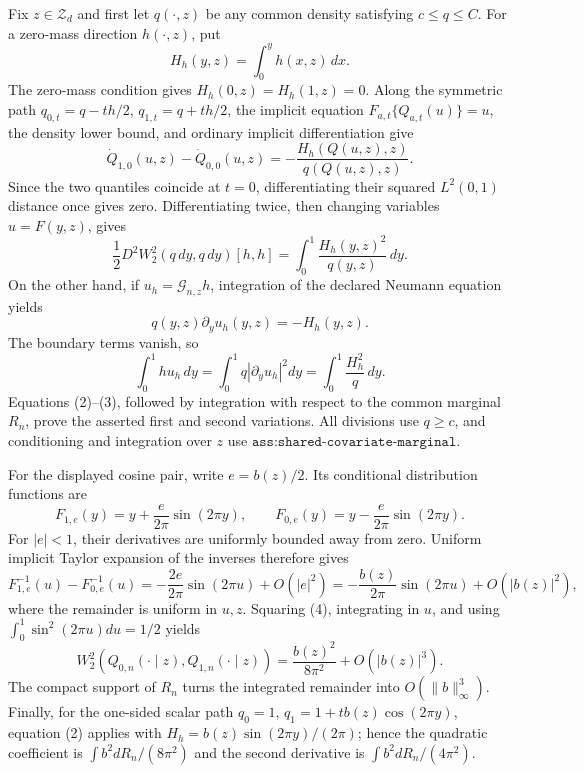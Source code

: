 Fix \(z\in\mathcal Z_d\) and first let \(q(\cdot,z)\) be any common density satisfying \(c\le q\le C\). For a zero-mass direction \(h(\cdot,z)\), put
\[
H_h(y,z)=\int_0^yh(x,z)\,dx.
\]
The zero-mass condition gives \(H_h(0,z)=H_h(1,z)=0\). Along the symmetric path \(q_{0,t}=q-th/2\), \(q_{1,t}=q+th/2\), the implicit equation \(F_{a,t}\{Q_{a,t}(u)\}=u\), the density lower bound, and ordinary implicit differentiation give
\[
\dot Q_{1,0}(u,z)-\dot Q_{0,0}(u,z)
=-\frac{H_h(Q(u,z),z)}{q(Q(u,z),z)}.                 \tag{1}
\]
Since the two quantiles coincide at \(t=0\), differentiating their squared \(L^2(0,1)\) distance once gives zero. Differentiating twice, then changing variables \(u=F(y,z)\), gives
\[
\frac12D^2W_2^2(q\,dy,q\,dy)[h,h]
=\int_0^1\frac{H_h(y,z)^2}{q(y,z)}\,dy.              \tag{2}
\]
On the other hand, if \(u_h=\mathcal G_{n,z}h\), integration of the declared Neumann equation yields
\[
q(y,z)\partial_yu_h(y,z)=-H_h(y,z).
\]
The boundary terms vanish, so
\[
\int_0^1h u_h\,dy
=\int_0^1q|\partial_yu_h|^2dy
=\int_0^1\frac{H_h^2}{q}\,dy.                        \tag{3}
\]
Equations (2)--(3), followed by integration with respect to the common marginal \(R_n\), prove the asserted first and second variations. All divisions use \(q\ge c\), and conditioning and integration over \(z\) use \(\texttt{ass:shared-covariate-marginal}\).

For the displayed cosine pair, write \(e=b(z)/2\). Its conditional distribution functions are
\[
F_{1,e}(y)=y+\frac{e}{2\pi}\sin(2\pi y),\qquad
F_{0,e}(y)=y-\frac{e}{2\pi}\sin(2\pi y).
\]
For \(|e|<1\), their derivatives are uniformly bounded away from zero. Uniform implicit Taylor expansion of the inverses therefore gives
\[
F_{1,e}^{-1}(u)-F_{0,e}^{-1}(u)
=-\frac{2e}{2\pi}\sin(2\pi u)+O(|e|^2)
=-\frac{b(z)}{2\pi}\sin(2\pi u)+O(|b(z)|^2),         \tag{4}
\]
where the remainder is uniform in \(u,z\). Squaring (4), integrating in \(u\), and using \(\int_0^1\sin^2(2\pi u)du=1/2\) yields
\[
W_2^2(Q_{0,n}(\cdot\mid z),Q_{1,n}(\cdot\mid z))
=\frac{b(z)^2}{8\pi^2}+O(|b(z)|^3).                  \tag{5}
\]
The compact support of \(R_n\) turns the integrated remainder into \(O(\|b\|_\infty^3)\). Finally, for the one-sided scalar path \(q_0=1\), \(q_1=1+t b(z)\cos(2\pi y)\), equation (2) applies with \(H_h=b(z)\sin(2\pi y)/(2\pi)\); hence the quadratic coefficient is \(\int b^2dR_n/(8\pi^2)\) and the second derivative is \(\int b^2dR_n/(4\pi^2)\).